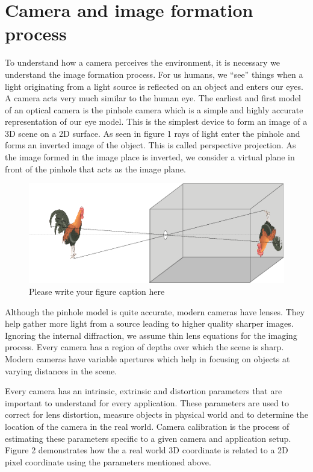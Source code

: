 \section{Camera and image formation process}
\label{imageFormation}

To understand how a camera perceives the environment, it is necessary we understand the image formation process. For us humans, we “see” things when a light originating from a light source is reflected on an object and enters our eyes. A camera acts very much similar to the human eye. The earliest and first model of an optical camera is the pinhole camera which is a simple and highly accurate representation of our eye model. This is the simplest device to form an image of a 3D scene on a 2D surface. As seen in figure 1 rays of light enter the pinhole and forms an inverted image of the object. This is called perspective projection. As the image formed in the image place is inverted, we consider a virtual plane in front of the pinhole that acts as the image plane.  

\begin{figure}[H]
  \includegraphics[width=\textwidth]{./figures/imageFormation.png}
\caption{Please write your figure caption here}
\label{fig:1}       %
\end{figure}

Although the pinhole model is quite accurate, modern cameras have lenses. They help gather more light from a source leading to higher quality sharper images. Ignoring the internal diffraction, we assume thin lens equations for the imaging process. Every camera has a region of depths over which the scene is sharp. Modern cameras have variable apertures which help in focusing on objects at varying distances in the scene.  

Every camera has an intrinsic, extrinsic and distortion parameters that are important to understand for every application. These parameters are used to correct for lens distortion, measure objects in physical world and to determine the location of the camera in the real world. Camera calibration is the process of estimating these parameters specific to a given camera and application setup. Figure 2 demonstrates how the a real world 3D coordinate is related to a 2D pixel coordinate using the parameters mentioned above.

